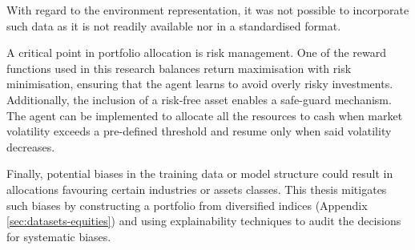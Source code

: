 With regard to the environment representation, it was not possible to incorporate such data as it is not readily available nor in a standardised format. 

A critical point in portfolio allocation is risk management. One of the reward functions used in this research balances return maximisation with risk minimisation, ensuring that the agent learns to avoid overly risky investments.
Additionally, the inclusion of a risk-free asset enables a safe-guard mechanism. The agent can be implemented to allocate all the resources to cash when market volatility exceeds a pre-defined threshold and resume only when said volatility decreases.

Finally, potential biases in the training data or model structure could result in allocations favouring certain industries or assets classes. This thesis mitigates such biases by constructing a portfolio from diversified indices (Appendix \ref{sec:datasets-equities}) and using explainability techniques to audit the decisions for systematic biases.
